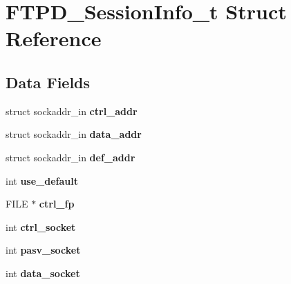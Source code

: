 \hypertarget{structFTPD__SessionInfo__t}{}\section{F\+T\+P\+D\+\_\+\+Session\+Info\+\_\+t Struct Reference}
\label{structFTPD__SessionInfo__t}
\subsection*{Data Fields}
\begin{DoxyCompactItemize}
\item 
\mbox{\label{structFTPD__SessionInfo__t_a2ce6bd8b10c3302d0f56c7f4f7d52a69}} 
struct sockaddr\+\_\+in {\bfseries ctrl\+\_\+addr}
\item 
\mbox{\label{structFTPD__SessionInfo__t_ab5281d1fdb97204691e935b00f8d6cb0}} 
struct sockaddr\+\_\+in {\bfseries data\+\_\+addr}
\item 
\mbox{\label{structFTPD__SessionInfo__t_a0e004ec4f6adf7efc0196197fe8ccd8f}} 
struct sockaddr\+\_\+in {\bfseries def\+\_\+addr}
\item 
\mbox{\label{structFTPD__SessionInfo__t_ac57d55276094e99aa3e1ae12cb1a4905}} 
int {\bfseries use\+\_\+default}
\item 
\mbox{\label{structFTPD__SessionInfo__t_aaf5367555dc1230a2f83cf9556255963}} 
F\+I\+LE $\ast$ {\bfseries ctrl\+\_\+fp}
\item 
\mbox{\label{structFTPD__SessionInfo__t_af832aeb0b7c6e139a3399afa3e5e781e}} 
int {\bfseries ctrl\+\_\+socket}
\item 
\mbox{\label{structFTPD__SessionInfo__t_a1bb01ea9d939c683b5feffc05d241f32}} 
int {\bfseries pasv\+\_\+socket}
\item 
\mbox{\label{structFTPD__SessionInfo__t_a5f98588465179eb685c67279c8989e7b}} 
int {\bfseries data\+\_\+socket}
\item 
\mbox{\label{structFTPD__SessionInfo__t_a6675233ce495c763baf2bbbcb21085af}} 

\end{DoxyCompactItemize}
